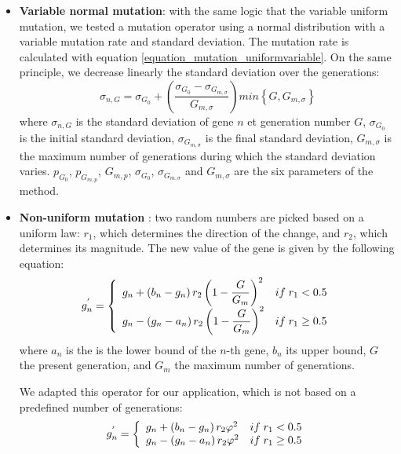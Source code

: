 \documentclass[twocol]{ametsoc}
\begin{document}
\begin{itemize}
	\item \textbf{Variable normal mutation}: with the same logic that the variable uniform mutation, we tested a mutation operator using a normal distribution with a variable mutation rate and standard deviation. The mutation rate is calculated with equation \ref{equation_mutation_uniformvariable}. On the same principle, we decrease linearly the standard deviation over the generations:
	\begin{equation}
	\sigma_{n,G} = \sigma_{G_{0}}+\left( \dfrac{\sigma_{G_{0}}-\sigma_{G_{m,\sigma}}}{G_{m,\sigma}} \right) min\left\lbrace G,G_{m,\sigma}\right\rbrace 
	\label{equation_mutation_normalvariable}
	\end{equation}
	where $\sigma_{n,G}$ is the standard deviation of gene $n$ et generation number $G$, $\sigma_{G_{0}}$ is the initial standard deviation, $\sigma_{G_{m,\sigma}}$ is the final standard deviation, $G_{m,\sigma}$ is the maximum number of generations during which the standard deviation varies. $p_{G_{0}}$, $p_{G_{m,p}}$, $G_{m,p}$, $\sigma_{G_{0}}$, $\sigma_{G_{m,\sigma}}$ and $G_{m,\sigma}$ are the six parameters of the method.
	
	\item \textbf{Non-uniform mutation} \citep{Michalewicz1996}: two random numbers are picked based on a uniform law: $r_{1}$, which determines the direction of the change, and $r_{2}$, which determines its magnitude. The new value of the gene is given by the following equation:
	\begin{equation}
	g_{n}^{'} = 
	\left\lbrace \begin{array}{l l} 
	g_{n} + \left(b_{n}-g_{n}\right) r_{2} \left(1 - \dfrac{G}{G_{m}} \right)^{2} & if \; r_{1} < 0.5 \\
	g_{n} - \left(g_{n}-a_{n}\right) r_{2} \left(1 - \dfrac{G}{G_{m}} \right)^{2} & if \; r_{1} \geq 0.5 \\
	\end{array} \right.
	\label{equation_mutation_nonuniform_original}
	\end{equation}
	where $a_{n}$ is the is the lower bound of the $n$-th gene, $b_{n}$ its upper bound, $G$ the present generation, and $G_{m}$ the maximum number of generations.
	
	We adapted this operator for our application, which is not based on a predefined number of generations:
	\begin{equation}
	g_{n}^{'} = 
	\left\lbrace \begin{array}{l l} 
	g_{n} + \left(b_{n}-g_{n}\right) r_{2} \varphi^{2} & if \; r_{1} < 0.5 \\
	g_{n} - \left(g_{n}-a_{n}\right) r_{2} \varphi^{2} & if \; r_{1} \geq 0.5 \\
	\end{array} \right.
	\label{equation_mutation_nonuniform}
	\end{equation}
	

\end{itemize}
\end{document}
